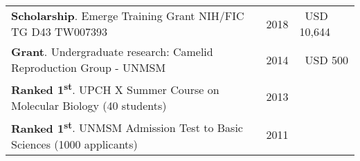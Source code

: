 \documentclass[margin,line]{res}
\newcommand{\ExternalLink}{%
	\tikz[x=1.2ex, y=1.2ex, baseline=-0.05ex]{%
		\begin{scope}[x=1ex, y=1ex]
			\clip (-0.1,-0.1) 
			--++ (-0, 1.2) 
			--++ (0.6, 0) 
			--++ (0, -0.6) 
			--++ (0.6, 0) 
			--++ (0, -1);
			\path[draw, 
			line width = 0.5, 
			rounded corners=0.5] 
			(0,0) rectangle (1,1);
		\end{scope}
		\path[draw, line width = 0.5] (0.5, 0.5) 
		-- (1, 1);
		\path[draw, line width = 0.5] (0.6, 1) 
		-- (1, 1) -- (1, 0.6);
	}
}
\begin{document}
\begin{resume}
\begin{tabular}{ l l l }
	
	\textbf{Scholarship}. Emerge Training Grant NIH/FIC TG D43 TW007393 &2018&~USD 10,644\\ %
	
	
	\textbf{Grant}. Undergraduate research: Camelid Reproduction Group - UNMSM&2014&~USD 500\\ %
	
	{\bf Ranked 1\textsuperscript{st}}. UPCH X Summer Course on Molecular Biology (40 students)& 2013 & \\
	
	{\bf Ranked 1\textsuperscript{st}}. UNMSM Admission Test to Basic Sciences (1000 applicants)& 2011 & \\
	
\end{tabular}\\


\end{resume}
\end{document}
